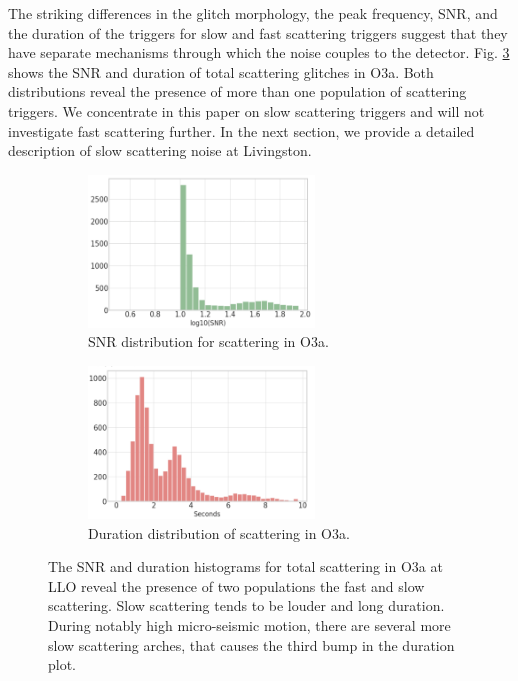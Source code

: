 \documentclass[12pt]{iopart}
\begin{document}
 The striking differences in the glitch morphology, the peak frequency, SNR, and the duration of the triggers for slow and fast scattering triggers suggest that they have separate mechanisms through which the noise couples to the detector. Fig. \ref{fig:snrdur} shows the SNR and duration of total scattering glitches in O3a. Both distributions reveal the presence of more than one population of scattering triggers. We concentrate in this paper on slow scattering triggers and will not investigate fast scattering further. In the next section, we provide a detailed description of slow scattering noise at Livingston.
\begin{figure}[h]
\captionsetup[subfigure]{font=scriptsize,labelfont=scriptsize}
   \centering
    \begin{subfigure}[b]{0.45\textwidth}
        \centering
         \includegraphics[width= 6cm]{histsnr4c.png}
         \caption{SNR distribution for scattering in O3a.}
         \label{fig:histsnr}
    \end{subfigure}
    \hfill
    \begin{subfigure}[b]{0.5\textwidth}
        \centering
         \includegraphics[width =6cm]{histdur4c.png}
         \caption{ Duration distribution of scattering in O3a.}
         \label{fig:histdur}
         
    
    \end{subfigure}
    \caption{The SNR and duration histograms for total scattering in O3a at LLO reveal the presence of two populations the fast and slow scattering. Slow scattering tends to be louder and long duration. During notably high micro-seismic motion, there are several more slow scattering arches, that causes the third bump in the duration plot.}
    \label{fig:snrdur}
    
\end{figure}
\end{document}
